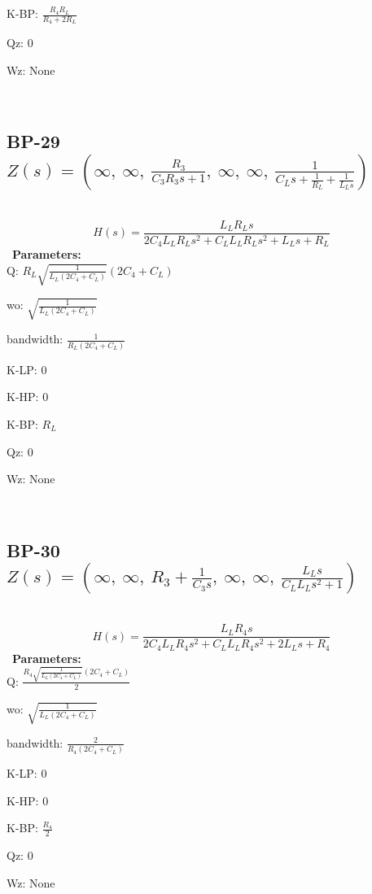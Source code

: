 \documentclass{article}
\begin{document}
K-BP: $\frac{R_{4} R_{L}}{R_{4} + 2 R_{L}}$\ 

Qz: $0$\ 

Wz: $\text{None}$\ 

\ 

\subsection{BP-29 $Z(s) = \left( \infty, \  \infty, \  \frac{R_{3}}{C_{3} R_{3} s + 1}, \  \infty, \  \infty, \  \frac{1}{C_{L} s + \frac{1}{R_{L}} + \frac{1}{L_{L} s}}\right)$ } \ 
\textbf{\[H(s) = \frac{L_{L} R_{L} s}{2 C_{4} L_{L} R_{L} s^{2} + C_{L} L_{L} R_{L} s^{2} + L_{L} s + R_{L}}\] } \ 
\textbf{Parameters:}\\ 

Q: $R_{L} \sqrt{\frac{1}{L_{L} \left(2 C_{4} + C_{L}\right)}} \left(2 C_{4} + C_{L}\right)$\ 

wo: $\sqrt{\frac{1}{L_{L} \left(2 C_{4} + C_{L}\right)}}$\ 

bandwidth: $\frac{1}{R_{L} \left(2 C_{4} + C_{L}\right)}$\ 

K-LP: $0$\ 

K-HP: $0$\ 

K-BP: $R_{L}$\ 

Qz: $0$\ 

Wz: $\text{None}$\ 

\ 

\subsection{BP-30 $Z(s) = \left( \infty, \  \infty, \  R_{3} + \frac{1}{C_{3} s}, \  \infty, \  \infty, \  \frac{L_{L} s}{C_{L} L_{L} s^{2} + 1}\right)$ } \ 
\textbf{\[H(s) = \frac{L_{L} R_{4} s}{2 C_{4} L_{L} R_{4} s^{2} + C_{L} L_{L} R_{4} s^{2} + 2 L_{L} s + R_{4}}\] } \ 
\textbf{Parameters:}\\ 

Q: $\frac{R_{4} \sqrt{\frac{1}{L_{L} \left(2 C_{4} + C_{L}\right)}} \left(2 C_{4} + C_{L}\right)}{2}$\ 

wo: $\sqrt{\frac{1}{L_{L} \left(2 C_{4} + C_{L}\right)}}$\ 

bandwidth: $\frac{2}{R_{4} \left(2 C_{4} + C_{L}\right)}$\ 

K-LP: $0$\ 

K-HP: $0$\ 

K-BP: $\frac{R_{4}}{2}$\ 

Qz: $0$\ 

Wz: $\text{None}$\ 
\end{document}
